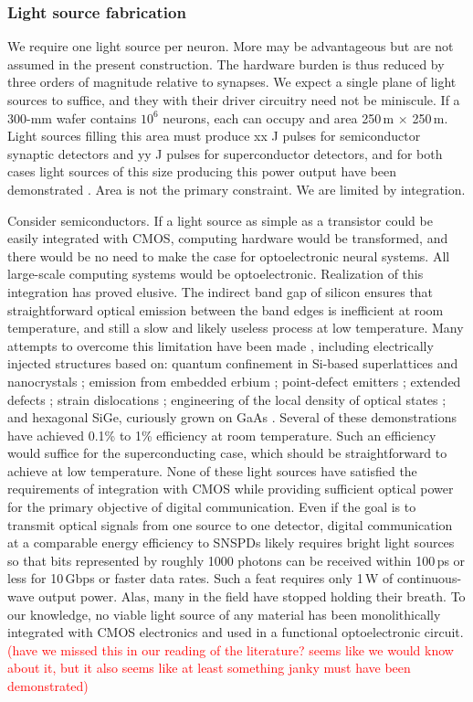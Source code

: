 \documentclass[twocolumn]{article}
\begin{document}
\subsubsection{Light source fabrication}
We require one light source per neuron. More may be advantageous but are not assumed in the present construction. The hardware burden is thus reduced by three orders of magnitude relative to synapses. We expect a single plane of light sources to suffice, and they with their driver circuitry need not be miniscule. If a 300-mm wafer contains $10^6$ neurons, each can occupy and area 250\,\textmu m $\times$ 250\,\textmu m. Light sources filling this area must produce xx J pulses for semiconductor synaptic detectors and yy J pulses for superconductor detectors, and for both cases light sources of this size producing this power output have been demonstrated \cite{}. Area is not the primary constraint. We are limited by integration.

Consider semiconductors. If a light source as simple as a transistor could be easily integrated with CMOS, computing hardware would be transformed, and there would be no need to make the case for optoelectronic neural systems. All large-scale computing systems would be optoelectronic. Realization of this integration has proved elusive. The indirect band gap of silicon ensures that straightforward optical emission between the band edges is inefficient at room temperature, and still a slow and likely useless process at low temperature. Many attempts to overcome this limitation have been made \cite{iyxi1993,shxu2007}, including electrically injected structures based on: quantum confinement in Si-based superlattices \cite{wali2008} and nanocrystals \cite{wabo2005}; emission from embedded erbium \cite{enpo1985,paga1996}; point-defect emitters \cite{brha1986,brbr1989,rosh2007b,bata2007}; extended defects \cite{nglo2001,milo2006}; strain dislocations \cite{kvba2004}; engineering of the local density of optical states \cite{grzh2001}; and hexagonal SiGe, curiously grown on GaAs \cite{Fadaly2020}. Several of these demonstrations have achieved 0.1\% \cite{kvba2004} to 1\% \cite{grzh2001} efficiency at room temperature. Such an efficiency would suffice for the superconducting case, which should be straightforward to achieve at low temperature. None of these light sources have satisfied the requirements of integration with CMOS while providing sufficient optical power for the primary objective of digital communication. Even if the goal is to transmit optical signals from one source to one detector, digital communication at a comparable energy efficiency to SNSPDs likely requires bright light sources so that bits represented by roughly 1000 photons can be received within 100\,ps or less for 10\,Gbps or faster data rates. Such a feat requires only 1\,\textmu W of continuous-wave output power. Alas, many in the field have stopped holding their breath. To our knowledge, no viable light source of any material has been monolithically integrated with CMOS electronics and used in a functional optoelectronic circuit. \textcolor{red}{(have we missed this in our reading of the literature? seems like we would know about it, but it also seems like at least something janky must have been demonstrated)}
\end{document}

